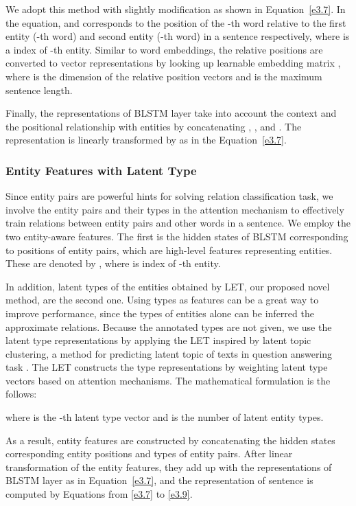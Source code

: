 \documentclass[twoside,leqno,twocolumn]{article}
\begin{document}
We adopt this method with slightly modification as shown in Equation~\ref{e3.7}.
In the equation,  and  corresponds to the position of the -th word relative to the first entity (-th word) and second entity (-th word) in a sentence respectively, where  is a index of -th entity.
Similar to word embeddings, the relative positions are converted to vector representations by looking up learnable embedding matrix , where  is the dimension of the relative position vectors and  is the maximum sentence length.

Finally, the representations of BLSTM layer take into account the context and the positional relationship with entities by concatenating , , and .
The representation is linearly transformed by  as in the Equation~\ref{e3.7}.

\subsubsection{Entity Features with Latent Type}
Since entity pairs are powerful hints for solving relation classification task, we involve the entity pairs and their types in the attention mechanism to effectively train relations between entity pairs and other words in a sentence.
We employ the two entity-aware features. 
The first is the hidden states of BLSTM corresponding to positions of entity pairs, which are high-level features representing entities.
These are denoted by , where  is index of -th entity.

In addition, latent types of the entities obtained by LET, our proposed novel method, are the second one.
Using types as features can be a great way to improve performance, since the types of entities alone can be inferred the approximate relations.
Because the annotated types are not given, we use the latent type representations by applying the LET inspired by latent topic clustering, a method for predicting latent topic of texts in question answering task \cite{yoon2018latent}.
The LET constructs the type representations by weighting  latent type vectors based on attention mechanisms.
The mathematical formulation is the follows:


where  is the -th latent type vector and  is the number of latent entity types.

As a result, entity features are constructed by concatenating the hidden states corresponding entity positions and types of entity pairs. After linear transformation of the entity features, they add up with the representations of BLSTM layer as in Equation~\ref{e3.7}, and the representation of sentence  is computed by Equations from \ref{e3.7} to \ref{e3.9}.
\end{document}
